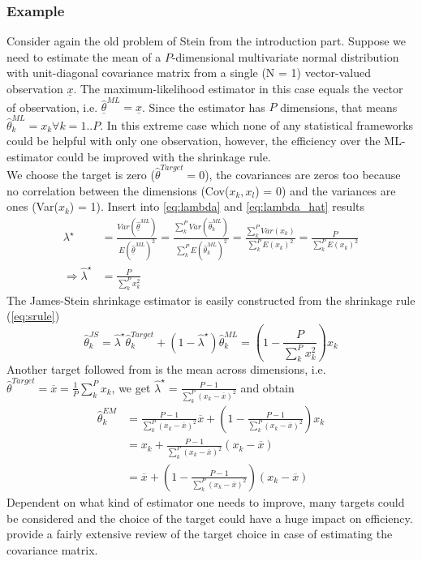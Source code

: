 \subsubsection{Example}
Consider again the old problem of Stein from the introduction part. Suppose we need to estimate the mean of a $P$-dimensional multivariate normal distribution with unit-diagonal covariance matrix from a single (N = 1) vector-valued observation $\underline{x}$. The maximum-likelihood estimator in this case equals the vector of observation, i.e. $\underline{\hat \theta}^{ML} = \underline{x}$. Since the estimator has $P$ dimensions, that means $\hat \theta^{ML}_k = x_k \forall k=1..P$. In this extreme case which none of any statistical frameworks could be helpful with only one observation, however, the efficiency over the ML-estimator could be improved with the shrinkage rule.\\
We choose the target is zero ($\hat \theta^{Target} = 0$), the covariances are zeros too because no correlation between the dimensions (Cov($x_k, x_l$) = 0) and the variances are ones (Var($x_k$) = 1). Insert into \autoref{eq:lambda} and \autoref{eq:lambda_hat} results
\begin{align*}
	\lambda^\star &= \frac{Var(\underline{\hat \theta}^{ML})}{E(\underline{\hat \theta}^{ML})^2} = \frac{\sum^P_k{Var(\hat \theta^{ML}_k)}}{\sum^P_k{E(\hat \theta^{ML}_k)^2}} = \frac{\sum^P_k{Var(x_k)}}{\sum^P_k{E(x_k)^2}} = \frac{P}{\sum^P_k{E(x_k)^2}}\\
	\Rightarrow \hat \lambda^\star &= \frac{P}{\sum^P_k{x_k^2}}
\end{align*}
The James-Stein shrinkage estimator is easily constructed from the shrinkage rule (\autoref{eq:srule})
\begin{equation*}
	\hat \theta^{JS}_k = \hat \lambda^\star \hat \theta^{Target}_k + (1-\hat \lambda^\star) \hat \theta^{ML}_k = \left( 1 - \frac{P}{\sum^P_k{x^2_k}} \right)x_k
\end{equation*}
Another target followed from \cite{Lindley:1972p2501} is the mean across dimensions, i.e. ${\hat \theta}^{Target} = \overline{x} = \frac{1}{P}\sum^P_k x_k$, we get $\hat\lambda^\star = \frac{P-1}{\sum^P_k{(x_k - \overline{x})^2}}$ and obtain
\begin{align*}
	\hat \theta^{EM}_k 	&= \frac{P-1}{\sum^P_k{(x_k - \overline{x})^2}} \overline{x} + \left( 1 - \frac{P-1}{\sum^P_k{(x_k - \overline{x})^2}} \right)x_k \\
						&= x_k + \frac{P-1}{\sum^P_k{(x_k - \overline{x})^2}}(x_k - \overline{x}) \\
						&= \overline{x} + \left( 1 - \frac{P-1}{\sum^P_k{(x_k - \overline{x})^2}} \right)(x_k - \overline{x})
\end{align*}
Dependent on what kind of estimator one needs to improve, many targets could be considered and the choice of the target could have a huge impact on efficiency. \cite{Schafer:2005p1040} provide a fairly extensive review of the target choice in case of estimating the covariance matrix.